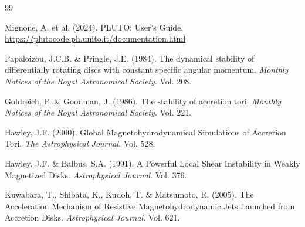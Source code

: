 \documentclass[11pt, letterpaper]{article}
\begin{document}
\begin{thebibliography}{99}

Mignone, A. et al. (2024). PLUTO: User's Guide. \url{https://plutocode.ph.unito.it/documentation.html}

Papaloizou, J.C.B. \& Pringle, J.E. (1984). The dynamical stability of differentially rotating discs with constant specific angular momentum. \textit{Monthly Notices of the Royal Astronomical Society}. Vol. 208. 

Goldreich, P. \& Goodman, J. (1986). The stability of accretion tori. \textit{Monthly Notices of the Royal Astronomical Society}. Vol. 221. 

Hawley, J.F. (2000). Global Magnetohydrodynamical Simulations of Accretion Tori. \textit{The Astrophysical Journal}. Vol. 528. 

Hawley, J.F. \& Balbus, S.A. (1991). A Powerful Local Shear Instability in Weakly Magnetized Disks. \textit{Astrophysical Journal}. Vol. 376. 

Kuwabara, T., Shibata, K., Kudoh, T. \& Matsumoto, R. (2005). The Acceleration Mechanism of Resistive Magnetohydrodynamic Jets Launched from Accretion Disks. \textit{Astrophysical Journal}. Vol. 621. 

\end{thebibliography}
\end{document}
